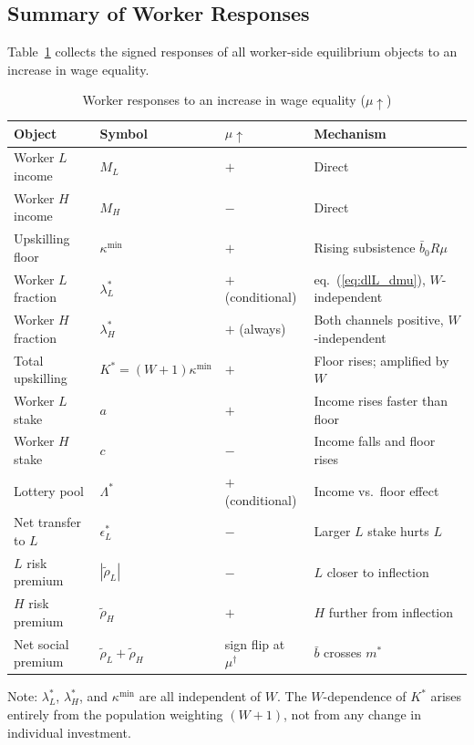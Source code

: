 \documentclass[12pt,a4paper]{article}
\begin{document}
\subsection{Summary of Worker Responses}

Table~\ref{tab:worker_responses} collects the signed responses of all
worker-side equilibrium objects to an increase in wage equality.

\begin{table}[h!]
\centering
\caption{Worker responses to an increase in wage equality ($\mu\uparrow$)}
\label{tab:worker_responses}
\renewcommand{\arraystretch}{1.2}
\begin{tabular}{lllp{5.5cm}}
\toprule
Object & Symbol & $\mu\uparrow$ & Mechanism \\
\midrule
Worker $L$ income   & $M_L$            & $+$ & Direct \\
Worker $H$ income   & $M_H$            & $-$ & Direct \\
Upskilling floor    & $\kappa^{\min}$  & $+$ & Rising subsistence $\bar{b}_0 R\mu$ \\
Worker $L$ fraction & $\lambda_L^*$    & $+$ (conditional) & eq.~(\ref{eq:dlL_dmu}), $W$-independent \\
Worker $H$ fraction & $\lambda_H^*$    & $+$ (always) & Both channels positive, $W$-independent \\
Total upskilling    & $K^* = (W{+}1)\kappa^{\min}$ & $+$ & Floor rises; amplified by $W$ \\
Worker $L$ stake    & $a$              & $+$ & Income rises faster than floor \\
Worker $H$ stake    & $c$              & $-$ & Income falls and floor rises \\
Lottery pool        & $\Lambda^*$      & $+$ (conditional) & Income vs.\ floor effect \\
Net transfer to $L$ & $\epsilon_L^*$   & $-$ & Larger $L$ stake hurts $L$ \\
$L$ risk premium    & $|\tilde\rho_L|$ & $-$ & $L$ closer to inflection \\
$H$ risk premium    & $\tilde\rho_H$   & $+$ & $H$ further from inflection \\
Net social premium  & $\tilde\rho_L{+}\tilde\rho_H$ & sign flip at $\mu^\dagger$ & $\bar{b}$ crosses $m^*$ \\
\bottomrule
\end{tabular}
\medskip
\small Note: $\lambda_L^*$, $\lambda_H^*$, and $\kappa^{\min}$ are all
independent of $W$. The $W$-dependence of $K^*$ arises entirely from the
population weighting $(W+1)$, not from any change in individual investment.
\end{table}
\end{document}
